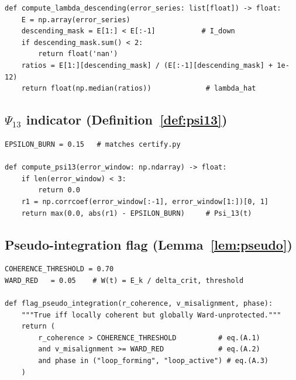 \documentclass[12pt,a4paper]{article}
\theoremstyle{plain}
\theoremstyle{definition}
\renewcommand{\Psi}{\varPsi}
\begin{document}
\begin{lstlisting}[caption={Contraction estimate on descending limb only}]
def compute_lambda_descending(error_series: list[float]) -> float:
    E = np.array(error_series)
    descending_mask = E[1:] < E[:-1]           # I_down
    if descending_mask.sum() < 2:
        return float('nan')
    ratios = E[1:][descending_mask] / (E[:-1][descending_mask] + 1e-12)
    return float(np.median(ratios))             # lambda_hat
\end{lstlisting}

\subsection{$\Psi_{13}$ indicator (Definition~\ref{def:psi13})}

\begin{lstlisting}[caption={Bifurcation gate indicator (\texttt{phase2\_detector.py})}]
EPSILON_BURN = 0.15   # matches certify.py

def compute_psi13(error_window: np.ndarray) -> float:
    if len(error_window) < 3:
        return 0.0
    r1 = np.corrcoef(error_window[:-1], error_window[1:])[0, 1]
    return max(0.0, abs(r1) - EPSILON_BURN)     # Psi_13(t)
\end{lstlisting}

\subsection{Pseudo-integration flag (Lemma~\ref{lem:pseudo})}

\begin{lstlisting}[caption={Pseudo-integration detection added to \texttt{pipeline.py}}]
COHERENCE_THRESHOLD = 0.70
WARD_RED   = 0.05    # W(t) = E_k / delta_crit, threshold

def flag_pseudo_integration(r_coherence, v_misalignment, phase):
    """True iff locally coherent but globally Ward-unprotected."""
    return (
        r_coherence > COHERENCE_THRESHOLD          # eq.(A.1)
        and v_misalignment >= WARD_RED             # eq.(A.2)
        and phase in ("loop_forming", "loop_active") # eq.(A.3)
    )
\end{lstlisting}
\end{document}

